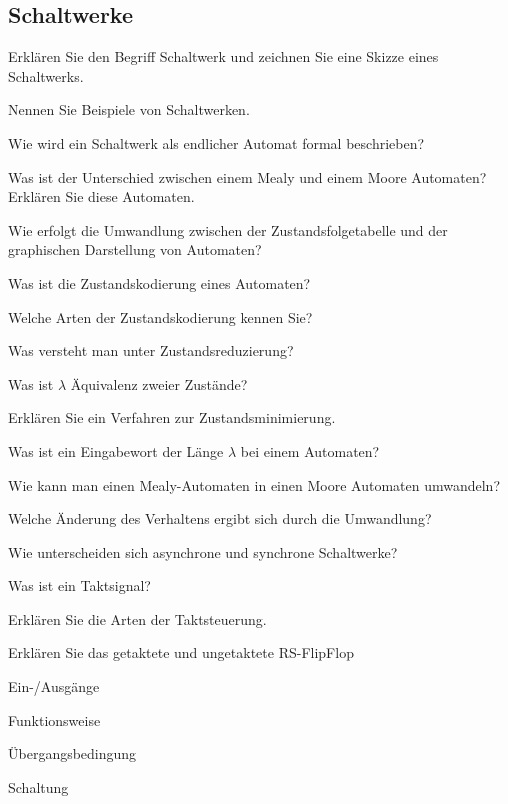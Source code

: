 \documentclass
[
  draft    = true,
  fontsize = 11pt,
  parskip  = half-,
  BCOR     = 0pt,
  DIV      = 11,
  ngerman,
  dvipsnames
]
{scrartcl}
\begin{document}
\subsection*{Schaltwerke}
\begin{mytemize}
  \item Erklären Sie den Begriff Schaltwerk und zeichnen Sie eine Skizze eines Schaltwerks.
  \item Nennen Sie Beispiele von Schaltwerken.
  \item Wie wird ein Schaltwerk als endlicher Automat formal beschrieben?
  \item Was ist der Unterschied zwischen einem Mealy und einem Moore Automaten? Erklären Sie diese Automaten.
  \item Wie erfolgt die Umwandlung zwischen der Zustandsfolgetabelle und der graphischen Darstellung von Automaten?
  \item Was ist die Zustandskodierung eines Automaten?
  \item Welche Arten der Zustandskodierung kennen Sie?
  \item Was versteht man unter Zustandsreduzierung?
  \item Was ist $\lambda$ Äquivalenz zweier Zustände?
  \item Erklären Sie ein Verfahren zur Zustandsminimierung.
  \item Was ist ein Eingabewort der Länge $\lambda$ bei einem Automaten?
  \item Wie kann man einen Mealy-Automaten in einen Moore Automaten umwandeln?
        \begin{mytemize}
          \item Welche Änderung des Verhaltens ergibt sich durch die Umwandlung?
        \end{mytemize}
  \item Wie unterscheiden sich asynchrone und synchrone Schaltwerke?
  \item Was ist ein Taktsignal?
  \item Erklären Sie die Arten der Taktsteuerung.
  \item Erklären Sie das getaktete und ungetaktete RS-FlipFlop
        \begin{mytemize}
          \item Ein-/Ausgänge
          \item Funktionsweise
          \item Übergangsbedingung
          \item Schaltung
        \end{mytemize}

\end{mytemize}
\end{document}
